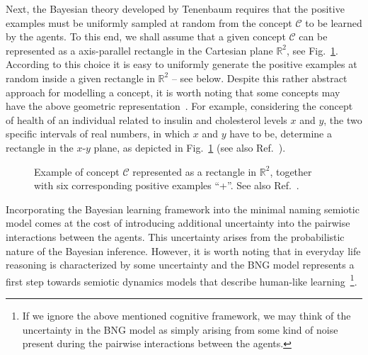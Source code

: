 \documentclass[review]{elsarticle}
\newcommand{\+}{\! + \!}
\begin{document}
Next, the Bayesian theory developed by Tenenbaum requires that the positive examples must be uniformly sampled at random from the concept $\mathcal{C}$ to be learned by the agents. 
To this end,  we shall assume  that a given concept $\mathcal{C}$ can be represented as a axis-parallel rectangle
in the Cartesian plane $\mathbb{R}^{2}$,  see Fig.~\ref{fig:rectangle}. 
According to this choice it is easy to uniformly generate the positive examples at random inside a given rectangle in  $\mathbb{R}^{2}$ -- see below.
Despite this rather abstract approach for modelling a concept, it is worth noting that some concepts may have the above geometric representation~\cite{Tenenbaum-1999b}. 
For example, considering the concept of health of an individual related to insulin and cholesterol levels $x$ and $y$, the two specific intervals of real numbers, in which $x$ and $y$ have to be, determine a rectangle in the $x$-$y$ plane, as depicted in Fig.~\ref{fig:rectangle} (see also Ref.~\cite{Tenenbaum-1999b}).

\begin{figure}[ht!]
    \caption{Example of concept $\mathcal{C}$ represented as a rectangle in $\mathbb{R}^{2}$, together with six corresponding positive examples ``+''.
    See also Ref.~\cite{Tenenbaum-1999b}.}
    \label{fig:rectangle}
\end{figure}


Incorporating the Bayesian learning framework into the minimal naming semiotic model comes at the cost of introducing additional uncertainty into the pairwise interactions between the agents. 
This uncertainty arises from the probabilistic nature of the Bayesian inference. 
However, it is worth noting that in everyday life reasoning is characterized by some uncertainty and the BNG model represents a first step towards semiotic dynamics models that describe human-like learning~\footnote{If we ignore  the above mentioned cognitive framework, we may think of the uncertainty in the BNG model as simply arising from some kind of noise  present during the pairwise interactions between the agents.}.
\end{document}
